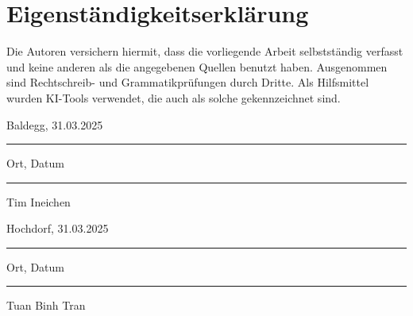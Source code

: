 \newpage
\section*{Eigenständigkeitserklärung}

Die Autoren versichern hiermit, dass die vorliegende Arbeit selbstständig verfasst und keine anderen als die angegebenen Quellen benutzt haben. 
Ausgenommen sind Rechtschreib- und Grammatikprüfungen durch Dritte. Als Hilfsmittel wurden KI-Tools verwendet, die auch als solche gekennzeichnet sind.


\vspace{2cm}

\begin{minipage}[t]{0.45\textwidth}
    Baldegg, 31.03.2025

    \noindent\rule{4cm}{0.4pt}

    Ort, Datum
\end{minipage}
\begin{minipage}[t]{0.45\textwidth}
    \rule{0cm}{0pt}

    \noindent\rule{5cm}{0.4pt}

    Tim Ineichen
\end{minipage}

\vspace{2cm}

\begin{minipage}[t]{0.45\textwidth}
    Hochdorf, 31.03.2025

    \noindent\rule{4cm}{0.4pt}

    Ort, Datum
\end{minipage}
\begin{minipage}[t]{0.45\textwidth}
    \rule{0cm}{0pt}

    \noindent\rule{5cm}{0.4pt}
    
    Tuan Binh Tran
\end{minipage}

\newpage